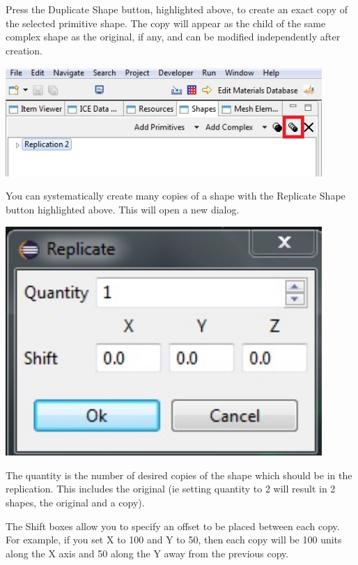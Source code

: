 Press the Duplicate Shape button, highlighted above, to create an exact copy of
the selected primitive shape. The copy will appear as the child of the same
complex shape as the original, if any, and can be modified independently after
creation.

\begin{center}
\includegraphics[width=12cm]{images/GeometryReplicateShape.jpg}
\end{center}

You can systematically create many copies of a shape with the Replicate Shape
button highlighted above. This will open a new dialog.

\begin{center}
\includegraphics[width=12cm]{images/GeometryReplicateDialog.jpg}
\end{center}

The quantity is the number of desired copies of the shape which should be in the
replication. This includes the original (ie setting quantity to 2 will result in
2 shapes, the original and a copy).

The Shift boxes allow you to specify an offset to be placed between each copy.
For example, if you set X to 100 and Y to 50, then each copy will be 100 units
along the X axis and 50 along the Y away from the previous copy. 

